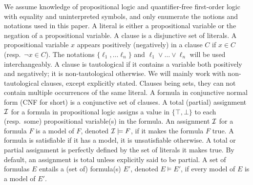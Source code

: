 \documentclass[smallextended]{svjour3}
\begin{document}
We assume knowledge of propositional logic and quantifier-free first-order logic
with equality and uninterpreted symbols, and only enumerate the notions and
notations used in this paper.
A literal is either a propositional variable or the negation of a propositional
variable.  A clause is a disjunctive set of literals.  A propositional variable
$x$ appears positively (negatively) in a clause $C$ if $x \in C$ (resp.\ $\neg x
\in C$).  The notations $\{\ell_1, \dots \ell_n\}$ and $\ell_1 \vee \dots \vee
\ell_n$ will be used interchangeably.  A clause is tautological if it contains a
variable both positively and negatively; it is non-tautological otherwise.  We
will mainly work with non-tautological clauses, except explicitly stated.
Clauses being sets, they can not contain multiple occurrences of the same
literal.  A formula in conjunctive normal form (CNF for short) is a conjunctive
set of clauses.  A total (partial) assignment $\cal I$ for a formula in
propositional logic assigns a value in $\{\top, \bot\}$ to each (resp.\ some)
propositional variable(s) in the formula.  An assignment $\cal I$ for a formula
$F$ is a model of $F$, denoted ${\cal I}\models F$, if it makes the formula $F$
true.  A formula is satisfiable if it has a model, it is unsatisfiable
otherwise.  A total or partial assignment is perfectly defined by the set of
literals it makes true.  By default, an assignment is total unless explicitly
said to be partial.  A set of formulas $E$ entails a (set of) formula(s) $E'$,
denoted $E\models E'$, if every model of $E$ is a model of $E'$.


\end{document}
